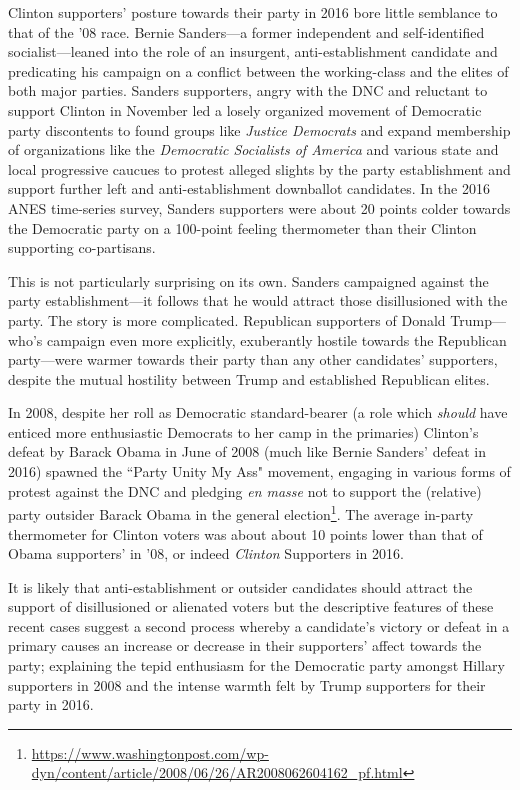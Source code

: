\documentclass[12pt]{paper}
\begin{document}
Clinton supporters' posture towards their party in 2016 bore little semblance to that of the '08 race. Bernie Sanders---a former independent and self-identified socialist---leaned into the role of an insurgent, anti-establishment candidate and predicating his campaign on a conflict between the working-class and the elites of both major parties. Sanders supporters, angry with the DNC and reluctant to support Clinton in November led a losely organized movement of Democratic party discontents to found groups like \textit{Justice Democrats} and expand membership of organizations like the \textit{Democratic Socialists of America} and various state and local progressive caucues to protest alleged slights by the party establishment and support further left and anti-establishment downballot candidates. In the 2016 ANES time-series survey, Sanders supporters were about 20 points colder towards the Democratic party on a 100-point feeling thermometer than their Clinton supporting co-partisans.

This is not particularly surprising on its own. Sanders campaigned against the party establishment---it follows that he would attract those disillusioned with the party. The story is more complicated. Republican supporters of Donald Trump---who's campaign even more explicitly, exuberantly hostile towards the Republican party---were warmer towards their party than any other candidates' supporters, despite the mutual hostility between Trump and established Republican elites.

In 2008, despite her roll as Democratic standard-bearer (a role which \textit{should} have enticed more enthusiastic Democrats to her camp in the primaries) Clinton's defeat by Barack Obama in June of 2008 (much like Bernie Sanders' defeat in 2016) spawned the ``Party Unity My Ass" movement, engaging in various forms of protest against the DNC and pledging \textit{en masse} not to support the (relative) party outsider Barack Obama in the general election\footnote{\url{https://www.washingtonpost.com/wp-dyn/content/article/2008/06/26/AR2008062604162_pf.html}}. The average in-party thermometer for Clinton voters was about about 10 points lower than that of Obama supporters' in '08, or indeed \textit{Clinton} Supporters in 2016.

It is likely that anti-establishment or outsider candidates should attract the support of disillusioned or alienated voters but the descriptive features of these recent cases suggest a second process whereby a candidate's victory or defeat in a primary causes an increase or decrease in their supporters' affect towards the party; explaining the tepid enthusiasm for the Democratic party amongst Hillary supporters in 2008 and the intense warmth felt by Trump supporters for their party in 2016.
\end{document}
